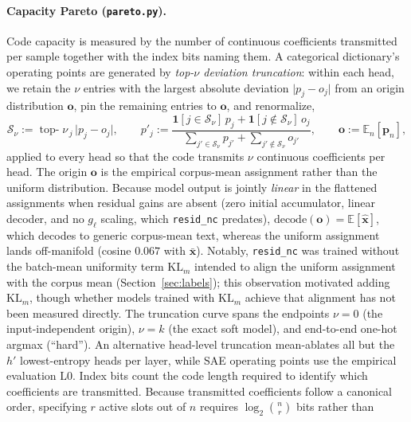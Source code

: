 \paragraph{Capacity Pareto (\texttt{pareto.py}).}
Code capacity is measured by the number of continuous coefficients
transmitted per sample together with the index bits naming them. A
categorical dictionary's operating points are generated by
\emph{top-$\nu$ deviation truncation}:
within each head, we retain the $\nu$ entries with the largest absolute
deviation $\lvert p_j - o_j\rvert$ from an origin distribution $\mathbf{o}$,
pin the remaining entries to $\mathbf{o}$, and renormalize,
\begin{equation}
	\mathcal{S}_\nu := \operatorname*{top-}\nu_{\,j}\, \lvert p_{j} - o_{j}\rvert,
	\qquad
	p'_j := \frac{\mathbf{1}[j \in \mathcal{S}_\nu]\,p_j + \mathbf{1}[j \notin \mathcal{S}_\nu]\,o_j}
	             {\sum_{j' \in \mathcal{S}_\nu} p_{j'} + \sum_{j' \notin \mathcal{S}_\nu} o_{j'}},
	\qquad \mathbf{o} := \mathbb{E}_n[\mathbf{p}_n],
	\label{eq:topdev}
\end{equation}
applied to every head so that the code transmits $\nu$ continuous
coefficients per head. The origin $\mathbf{o}$ is the empirical corpus-mean
assignment rather than the uniform distribution. Because model output is
jointly \emph{linear} in the flattened assignments when residual gains are
absent (zero initial accumulator, linear decoder, and no $g_\ell$ scaling,
which \texttt{resid\_nc} predates), $\mathrm{decode}(\mathbf{o}) =
\mathbb{E}[\hat{\mathbf{x}}]$, which decodes to generic corpus-mean text,
whereas the uniform assignment lands off-manifold (cosine $0.067$ with
$\bar{\mathbf{x}}$). Notably, \texttt{resid\_nc} was trained without the
batch-mean uniformity term $\mathrm{KL}_m$ intended to align the uniform
assignment with the corpus mean (Section~\ref{sec:labels}); this
observation motivated adding $\mathrm{KL}_m$, though whether models trained
with $\mathrm{KL}_m$ achieve that alignment has not been measured directly.
The truncation curve spans the endpoints $\nu{=}0$ (the input-independent
origin), $\nu{=}k$ (the exact soft model), and end-to-end one-hot argmax
(``hard''). An alternative head-level truncation mean-ablates all but the
$h'$ lowest-entropy heads per layer, while SAE operating points use the
empirical evaluation $\mathrm{L0}$. Index bits count the code length
required to identify which coefficients are transmitted. Because
transmitted coefficients follow a canonical order, specifying $r$ active
slots out of $n$ requires $\log_2\binom{n}{r}$ bits rather than

